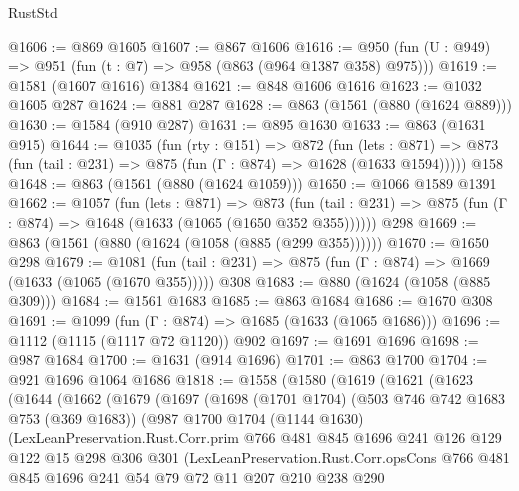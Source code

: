 \begin{lexlean}{RustStd}
\begin{coremodule}
@1606 := @869 @1605
@1607 := @867 @1606
@1616 := @950 (fun (U : @949) => @951 (fun (t : @7) => @958 (@863 (@964 @1387 @358) @975)))
@1619 := @1581 (@1607 @1616) @1384
@1621 := @848 @1606 @1616
@1623 := @1032 @1605 @287
@1624 := @881 @287
@1628 := @863 (@1561 (@880 (@1624 @889)))
@1630 := @1584 (@910 @287)
@1631 := @895 @1630
@1633 := @863 (@1631 @915)
@1644 := @1035
    (fun (rty : @151) =>
    @872
      (fun (lets : @871) =>
      @873 (fun (tail : @231) => @875 (fun (Γ : @874) => @1628 (@1633 @1594)))))
    @158
@1648 := @863 (@1561 (@880 (@1624 @1059)))
@1650 := @1066 @1589 @1391
@1662 := @1057
    (fun (lets : @871) =>
    @873 (fun (tail : @231) => @875 (fun (Γ : @874) => @1648 (@1633 (@1065 (@1650 @352 @355))))))
    @298
@1669 := @863 (@1561 (@880 (@1624 (@1058 (@885 (@299 @355))))))
@1670 := @1650 @298
@1679 := @1081
    (fun (tail : @231) => @875 (fun (Γ : @874) => @1669 (@1633 (@1065 (@1670 @355)))))
    @308
@1683 := @880 (@1624 (@1058 (@885 @309)))
@1684 := @1561 @1683
@1685 := @863 @1684
@1686 := @1670 @308
@1691 := @1099 (fun (Γ : @874) => @1685 (@1633 (@1065 @1686)))
@1696 := @1112 (@1115 (@1117 @72 @1120)) @902
@1697 := @1691 @1696
@1698 := @987 @1684
@1700 := @1631 (@914 @1696)
@1701 := @863 @1700
@1704 := @921 @1696 @1064 @1686
@1818 := @1558
    (@1580
      (@1619
        (@1621
          (@1623
            (@1644
              (@1662
                (@1679
                  (@1697
                    (@1698
                      (@1701 @1704)
                      (@503 @746 @742 @1683 @753 (@369 @1683))
                      (@987
                        @1700
                        @1704
                        (@1144 @1630)
                        (LexLeanPreservation.Rust.Corr.prim
                          @766
                          @481
                          @845
                          @1696
                          @241
                          @126
                          @129
                          @122
                          @15
                          @298
                          @306
                          @301
                          (LexLeanPreservation.Rust.Corr.opsCons
                            @766
                            @481
                            @845
                            @1696
                            @241
                            @54
                            @79
                            @72
                            @11
                            @207
                            @210
                            @238
                            @290

\end{coremodule}
\end{lexlean}
